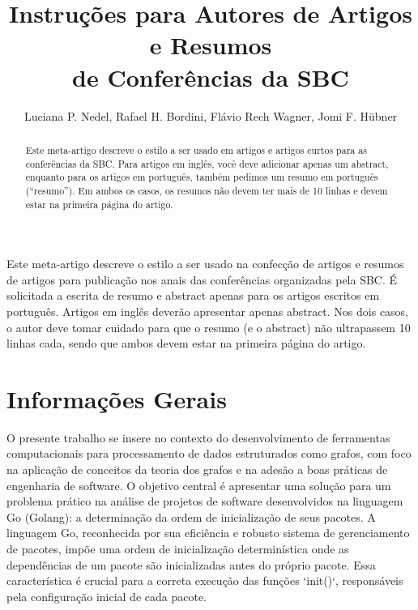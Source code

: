 \documentclass[12pt]{article}
\title{Instruções para Autores de Artigos e Resumos\\ de Conferências da SBC}
\author{Luciana P. Nedel\inst{1}, Rafael H. Bordini\inst{2}, Flávio Rech
  Wagner\inst{1}, Jomi F. Hübner\inst{3} }
\begin{document}
 

\maketitle

\begin{resumo} 
  Este meta-artigo descreve o estilo a ser usado na confecção de artigos e
  resumos de artigos para publicação nos anais das conferências organizadas
  pela SBC. É solicitada a escrita de resumo e abstract apenas para os artigos
  escritos em português. Artigos em inglês deverão apresentar apenas abstract.
  Nos dois casos, o autor deve tomar cuidado para que o resumo (e o abstract)
  não ultrapassem 10 linhas cada, sendo que ambos devem estar na primeira
  página do artigo.
\end{resumo}

     

\begin{abstract}
  Este meta-artigo descreve o estilo a ser usado em artigos e artigos curtos
  para as conferências da SBC. Para artigos em inglês, você deve adicionar apenas um
  abstract, enquanto para os artigos em português, também pedimos um resumo em
  português (``resumo''). Em ambos os casos, os resumos não devem ter mais de
  10 linhas e devem estar na primeira página do artigo.
\end{abstract}

\section{Informações Gerais}

O presente trabalho se insere no contexto do desenvolvimento de ferramentas computacionais para processamento de dados estruturados como grafos, com foco na aplicação de conceitos da teoria dos grafos e na adesão a boas práticas de engenharia de software. O objetivo central é apresentar uma solução para um problema prático na análise de projetos de software desenvolvidos na linguagem Go (Golang): a determinação da ordem de inicialização de seus pacotes. A linguagem Go, reconhecida por sua eficiência e robusto sistema de gerenciamento de pacotes, impõe uma ordem de inicialização determinística onde as dependências de um pacote são inicializadas antes do próprio pacote. Essa característica é crucial para a correta execução das funções `init()`, responsáveis pela configuração inicial de cada pacote.
\end{document}
